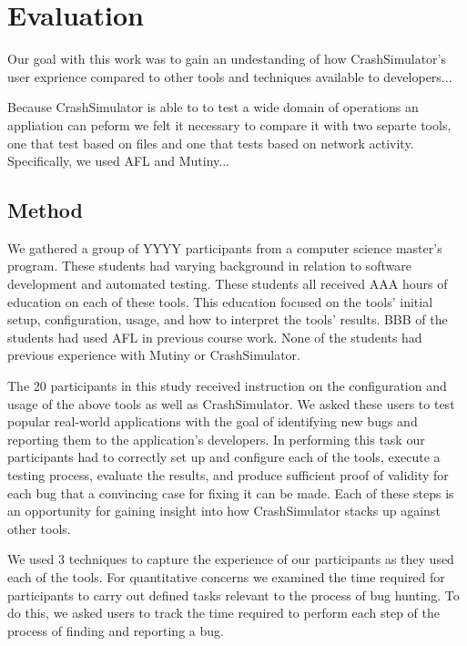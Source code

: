 \section{Evaluation}
\label{SEC:evaluation}


Our goal with this work was to gain an undestanding of how CrashSimulator's
user exprience compared to other tools and techniques available to
developers...

Because CrashSimulator is able to to test a wide domain of operations an
appliation can peform we felt it necessary to compare it with two separte
tools, one that test based on files and one that tests based on network
activity.  Specifically, we used AFL and Mutiny...


\subsection{Method}

We gathered a group of YYYY participants from a computer science master's
program.  These students had varying background in relation to software
development and automated testing.  These students all received AAA hours
of education on each of these tools.  This education focused on the tools'
initial setup, configuration, usage, and how to interpret the tools'
results.  BBB of the students had used AFL in previous course work.  None
of the students had previous experience with Mutiny or CrashSimulator.

The 20 participants in this study received instruction on the configuration
and usage of the above tools as well as CrashSimulator.  We asked these
users to test popular real-world applications with the goal of identifying
new bugs and reporting them to the application's developers.  In performing
this task our participants had to correctly set up and configure each of
the tools, execute a testing process, evaluate the results, and produce
sufficient proof of validity for each bug that a convincing case for fixing
it can be made.  Each of these steps is an opportunity for gaining insight
into how CrashSimulator stacks up against other tools.

We used 3 techniques to capture the experience of our participants as they
used each of the tools.  For quantitative concerns we examined the time
required for participants to carry out defined tasks relevant to the
process of bug hunting.  To do this, we asked users to track the time
required to perform each step of the process of finding and reporting a
bug.


